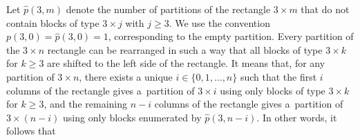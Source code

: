 \documentclass[12pt,a4paper]{amsart}
\numberwithin{equation}{section}
\theoremstyle{plain}
\newtheorem{thm}{Theorem}[section]
\theoremstyle{definition}
\theoremstyle{remark}
\begin{document}

Let $\widehat p(3,m)$ denote the number of partitions of the rectangle $3\times m$ that do not contain blocks of type $3\times j$ with $j\ge 3$. 
We use the convention $p(3,0)=\widehat p(3,0)=1$, corresponding to the empty partition. Every partition of the $3 \times n$ rectangle can be rearranged in such a way that all blocks of type $3 \times k$ for $k \geq 3$ are shifted to the left side of the rectangle. It means that, for any partition of $3 \times n$, there exists a unique $i \in\{ 0,1, \ldots, n\}$ such that the first $i$ columns of the rectangle gives a~partition of $3 \times i$ using only blocks of type $3 \times k$ for $k\geq3$, and the remaining $n-i$ columns of the rectangle gives a~partition of $3 \times (n-i)$  using only blocks enumerated by $\widehat p(3,n-i)$. In other words, it follows that
\end{document}
